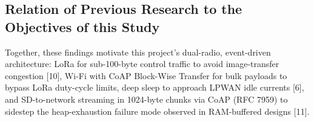 \documentclass[12pt,a4paper]{article}
\newcommand{\changed}[1]{\textcolor{red}{#1}}
\begin{document}
\subsection{Relation of Previous Research to the Objectives of this Study}

Together, these findings motivate this project's dual-radio, event-driven architecture: LoRa for sub-100-byte control traffic to avoid image-transfer congestion [10], Wi-Fi with CoAP Block-Wise Transfer for bulk payloads to bypass LoRa duty-cycle limits, deep sleep to approach LPWAN idle currents [6], and SD-to-network streaming in 1024-byte chunks via CoAP (RFC 7959) to sidestep the heap-exhaustion failure mode observed in RAM-buffered designs [11].

\begin{table}[ht]
\centering
\footnotesize
\caption{\changed{Comparison of candidate communications technologies considered for this project [2]--[5], [10].}}
\label{tab:comms-tech}
\setlength{\tabcolsep}{4pt}
\end{table}
\end{document}
